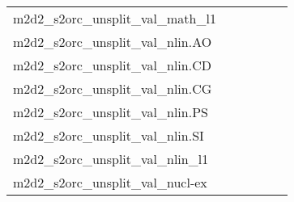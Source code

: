 {\begin{longtable}{m{6cm}m{1.7cm}m{1.7cm}m{1.7cm}m{1.7cm}m{1.7cm}}
	m2d2\_s2orc\_unsplit\_val\_math\_l1  & \colorbox[HTML]{77c578}{\makebox[\mywidth][c]{7.81}} & \colorbox[HTML]{e5f4ab}{\makebox[\mywidth][c]{8.07}} & \colorbox[HTML]{ffffe5}{\makebox[\mywidth][c]{9.36}} & \colorbox[HTML]{d0ec9e}{\makebox[\mywidth][c]{7.99}} & \colorbox[HTML]{9ad486}{\makebox[\mywidth][c]{7.87}}\\
	m2d2\_s2orc\_unsplit\_val\_nlin.AO  & \colorbox[HTML]{9bd587}{\makebox[\mywidth][c]{11.82}} & \colorbox[HTML]{d8efa2}{\makebox[\mywidth][c]{12.01}} & \colorbox[HTML]{ffffe5}{\makebox[\mywidth][c]{13.77}} & \colorbox[HTML]{bbe395}{\makebox[\mywidth][c]{11.90}} & \colorbox[HTML]{77c578}{\makebox[\mywidth][c]{11.75}}\\
	m2d2\_s2orc\_unsplit\_val\_nlin.CD  & \colorbox[HTML]{addd8e}{\makebox[\mywidth][c]{12.73}} & \colorbox[HTML]{dbf1a4}{\makebox[\mywidth][c]{12.91}} & \colorbox[HTML]{ffffe5}{\makebox[\mywidth][c]{14.88}} & \colorbox[HTML]{d3eda0}{\makebox[\mywidth][c]{12.87}} & \colorbox[HTML]{77c578}{\makebox[\mywidth][c]{12.60}}\\
	m2d2\_s2orc\_unsplit\_val\_nlin.CG  & \colorbox[HTML]{77c578}{\makebox[\mywidth][c]{12.43}} & \colorbox[HTML]{d9f0a3}{\makebox[\mywidth][c]{12.75}} & \colorbox[HTML]{ffffe5}{\makebox[\mywidth][c]{14.88}} & \colorbox[HTML]{b8e293}{\makebox[\mywidth][c]{12.61}} & \colorbox[HTML]{7cc77a}{\makebox[\mywidth][c]{12.44}}\\
	m2d2\_s2orc\_unsplit\_val\_nlin.PS  & \colorbox[HTML]{a2d889}{\makebox[\mywidth][c]{11.29}} & \colorbox[HTML]{d9f0a3}{\makebox[\mywidth][c]{11.44}} & \colorbox[HTML]{ffffe5}{\makebox[\mywidth][c]{12.86}} & \colorbox[HTML]{c9e99b}{\makebox[\mywidth][c]{11.39}} & \colorbox[HTML]{77c578}{\makebox[\mywidth][c]{11.22}}\\
	m2d2\_s2orc\_unsplit\_val\_nlin.SI  & \colorbox[HTML]{77c578}{\makebox[\mywidth][c]{9.44}} & \colorbox[HTML]{eef8b2}{\makebox[\mywidth][c]{9.81}} & \colorbox[HTML]{ffffe5}{\makebox[\mywidth][c]{11.28}} & \colorbox[HTML]{ceeb9e}{\makebox[\mywidth][c]{9.64}} & \colorbox[HTML]{9bd587}{\makebox[\mywidth][c]{9.51}}\\
	m2d2\_s2orc\_unsplit\_val\_nlin\_l1  & \colorbox[HTML]{77c578}{\makebox[\mywidth][c]{12.43}} & \colorbox[HTML]{d9f0a3}{\makebox[\mywidth][c]{12.75}} & \colorbox[HTML]{ffffe5}{\makebox[\mywidth][c]{14.88}} & \colorbox[HTML]{b8e293}{\makebox[\mywidth][c]{12.61}} & \colorbox[HTML]{7cc77a}{\makebox[\mywidth][c]{12.44}}\\
	m2d2\_s2orc\_unsplit\_val\_nucl-ex  & \colorbox[HTML]{edf8b2}{\makebox[\mywidth][c]{13.02}} & \colorbox[HTML]{e3f4aa}{\makebox[\mywidth][c]{12.94}} & \colorbox[HTML]{ffffe5}{\makebox[\mywidth][c]{14.61}} & \colorbox[HTML]{d1ec9f}{\makebox[\mywidth][c]{12.85}} & \colorbox[HTML]{77c578}{\makebox[\mywidth][c]{12.63}}\\

\end{longtable}}

